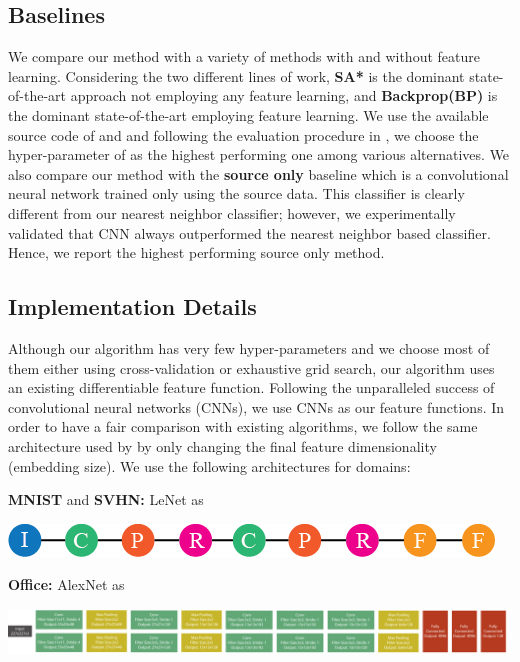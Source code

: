 \subsection{Baselines}
We compare our method with a variety of methods with and without feature learning. Considering the two different lines of work, \textbf{SA*}\cite{fernando13} is the dominant state-of-the-art approach not employing any feature learning, and \textbf{Backprop(BP)}\cite{ganin15} is the dominant state-of-the-art employing feature learning. We use the available source code of \cite{ganin15} and \cite{fernando13} and following the evaluation procedure in \cite{ganin15}, we choose the hyper-parameter of \cite{fernando13} as the highest performing one among various alternatives. We also compare our method with the \textbf{source only} baseline which is a convolutional neural network trained only using the source data. This classifier is clearly different from our nearest neighbor classifier; however, we experimentally validated that CNN always outperformed the nearest neighbor based classifier. Hence, we report the highest performing source only method.

\subsection{Implementation Details}
\label{imp_det}
Although our algorithm has very few hyper-parameters and we choose most of them either using cross-validation or exhaustive grid search, our algorithm uses an existing differentiable feature function. Following the unparalleled success of convolutional neural networks (CNNs), we use CNNs as our feature functions.  In order to have a fair comparison with existing algorithms, we follow the same architecture used by \cite{ganin15} by only changing the final feature dimensionality (embedding size). We use the following architectures for domains:

\noindent \textbf{MNIST} and \textbf{SVHN:} LeNet\cite{lenet} as

\includegraphics[width=\columnwidth]{lenet}


\noindent \textbf{Office:} AlexNet\cite{alexnet} as

\includegraphics[width=\columnwidth]{alexnet}


